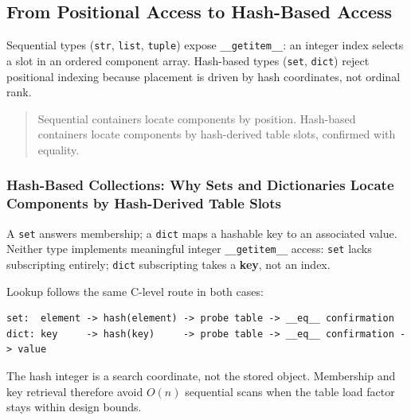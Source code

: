 \subsection{From Positional Access to Hash-Based Access}

Sequential types (\texttt{str}, \texttt{list}, \texttt{tuple}) expose \texttt{\_\_getitem\_\_}: an integer index selects a slot in an ordered component array. Hash-based types (\texttt{set}, \texttt{dict}) reject positional indexing because placement is driven by hash coordinates, not ordinal rank.

\begin{quote}
Sequential containers locate components by position. Hash-based containers locate components by hash-derived table slots, confirmed with equality.
\end{quote}

\subsubsection{Hash-Based Collections: Why Sets and Dictionaries Locate Components by Hash-Derived Table Slots}

A \texttt{set} answers membership; a \texttt{dict} maps a hashable key to an associated value. Neither type implements meaningful integer \texttt{\_\_getitem\_\_} access: \texttt{set} lacks subscripting entirely; \texttt{dict} subscripting takes a \textbf{key}, not an index.

Lookup follows the same C-level route in both cases:

\begin{verbatim}
set:  element -> hash(element) -> probe table -> __eq__ confirmation
dict: key     -> hash(key)     -> probe table -> __eq__ confirmation -> value
\end{verbatim}

The hash integer is a search coordinate, not the stored object. Membership and key retrieval therefore avoid $O(n)$ sequential scans when the table load factor stays within design bounds.
